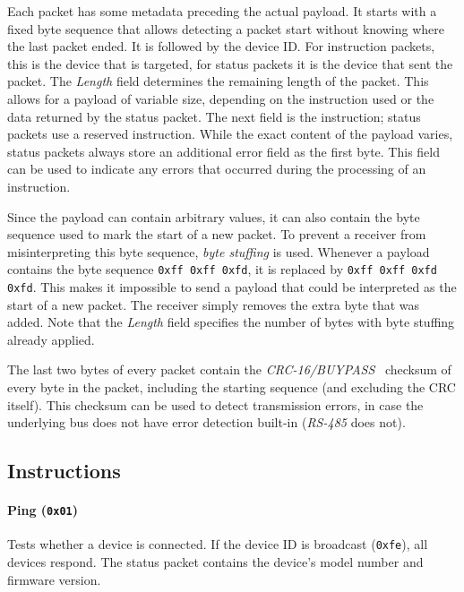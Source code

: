 Each packet has some metadata preceding the actual payload. It starts with a fixed byte sequence that allows
detecting a packet start without knowing where the last packet ended. It is followed by the device ID. For
instruction packets, this is the device that is targeted, for status packets it is the device that sent the
packet. The \textit{Length} field determines the remaining length of the packet. This allows for a payload of variable
size, depending on the instruction used or the data returned by the status packet. The next field is the instruction;
status packets use a reserved instruction. While the exact content of the payload varies, status packets always
store an additional error field as the first byte. This field can be used to indicate any errors that occurred
during the processing of an instruction.

Since the payload can contain arbitrary values, it can also contain the byte sequence used to mark the start of
a new packet. To prevent a receiver from misinterpreting this byte sequence, \textit{byte stuffing} is used.
Whenever a payload contains the byte sequence \lstinline{0xff 0xff 0xfd}, it is replaced by
\lstinline{0xff 0xff 0xfd 0xfd}. This makes it impossible to send a payload that could be interpreted as the
start of a new packet. The receiver simply removes the extra byte that was added. Note that the
\textit{Length} field specifies the number of bytes with byte stuffing already applied.

The last two bytes of every packet contain the \textit{CRC-16/BUYPASS}~\cite{crc-16-buypass} checksum of
every byte in the packet, including the starting sequence (and excluding the CRC itself). This checksum
can be used to detect transmission errors, in case the underlying bus does not have error detection
built-in (\textit{RS-485} does not).

\subsection{Instructions}
\label{basics/dynamixel-protocol/instructions}

\paragraph{Ping (\lstinline{0x01})}

Tests whether a device is connected. If the device ID is broadcast (\lstinline{0xfe}), all devices
respond. The status packet contains the device's model number and firmware version.

